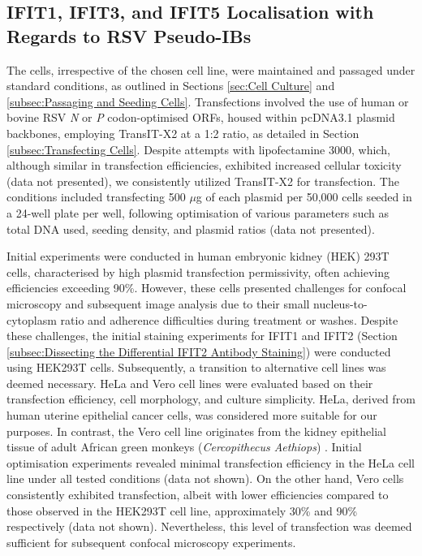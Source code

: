 \subsection{IFIT1, IFIT3, and IFIT5 Localisation with Regards to RSV Pseudo-IBs} \label{subsec:IFIT1, IFIT3, and IFIT5 Localisation with Regards to RSV Pseudo-IBs}
The cells, irrespective of the chosen cell line, were maintained and passaged under standard conditions, as outlined in Sections \ref{sec:Cell Culture} and \ref{subsec:Passaging and Seeding Cells}. Transfections involved the use of human or bovine RSV \textit{N} or \textit{P} codon-optimised ORFs, housed within pcDNA3.1 plasmid backbones, employing TransIT-X2 at a 1:2 ratio, as detailed in Section \ref{subsec:Transfecting Cells}. Despite attempts with lipofectamine 3000, which, although similar in transfection efficiencies, exhibited increased cellular toxicity (data not presented), we consistently utilized TransIT-X2 for transfection. The conditions included transfecting 500 $\mu$g of each plasmid per 50,000 cells seeded in a 24-well plate per well, following optimisation of various parameters such as total DNA used, seeding density, and plasmid ratios (data not presented).

Initial experiments were conducted in human embryonic kidney (HEK) 293T cells, characterised by high plasmid transfection permissivity, often achieving efficiencies exceeding 90\%. However, these cells presented challenges for confocal microscopy and subsequent image analysis due to their small nucleus-to-cytoplasm ratio and adherence difficulties during treatment or washes. Despite these challenges, the initial staining experiments for IFIT1 and IFIT2 (Section \ref{subsec:Dissecting the Differential IFIT2 Antibody Staining}) were conducted using HEK293T cells. Subsequently, a transition to alternative cell lines was deemed necessary. HeLa and Vero cell lines were evaluated based on their transfection efficiency, cell morphology, and culture simplicity. HeLa, derived from human uterine epithelial cancer cells, was considered more suitable for our purposes. In contrast, the Vero cell line originates from the kidney epithelial tissue of adult African green monkeys (\textit{Cercopithecus Aethiops}) \cite{Simizu1967CharacterizationVero}. Initial optimisation experiments revealed minimal transfection efficiency in the HeLa cell line under all tested conditions (data not shown). On the other hand, Vero cells consistently exhibited transfection, albeit with lower efficiencies compared to those observed in the HEK293T cell line, approximately 30\% and 90\% respectively (data not shown). Nevertheless, this level of transfection was deemed sufficient for subsequent confocal microscopy experiments.

